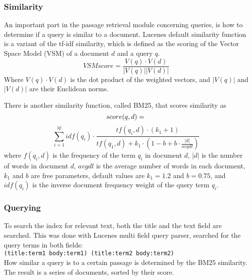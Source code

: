 \subsubsection{Similarity}
An important part in the passage retrieval module concerning queries, is how to determine if a query is similar to a document.
Lucenes default similarity function is a variant of the tf-idf similarity, 
which is defined as the scoring of the Vector Space Model (VSM) of a document $d$ and a query $q$.
\[VSM score = \frac{V(q)\cdot V(d)}{|V(q)||V(d)|} \]
Where $V(q) \cdot V(d)$ is the dot product of the weighted vectors, and $|V(q)|$ and $|V(d)|$ are their Euclidean norms. \cite{tfidfsimilarity}

There is another similarity function, called BM25, that scores similarity as
\[
score(q,d) = \\
\]
\[
\sum_{i=1}^{|q|} idf(q_i) \cdot \frac{tf(q_i,d) \cdot (k_1 + 1)}{tf(q_1,d) + k_1 \cdot (1 - b + b \cdot \frac{|d|}{avgdl})}
\]
where $f(q_i,d)$ is the frequency of the term $q_i$ in document $d$, 
$|d|$ is the number of words in document $d$,
$avgdl$ is the average number of words in each document,
$k_1$ and $b$ are free parameters, default values are $k_1 = 1.2$ and $b = 0.75$,
and $idf(q_i)$ is the inverse document frequency weight of the query term $q_i$. \cite{bm25similarity}

\subsubsection{Querying}
To search the index for relevant text, both the title and the text field are searched. 
This was done with Lucenes multi field query parser, searched for the query terms in both fields: \\
\texttt{(title:term1 body:term1) (title:term2 body:term2)} \\
How similar a query is to a certain passage is determined by the BM25 similarity.
The result is a series of documents, sorted by their score.
